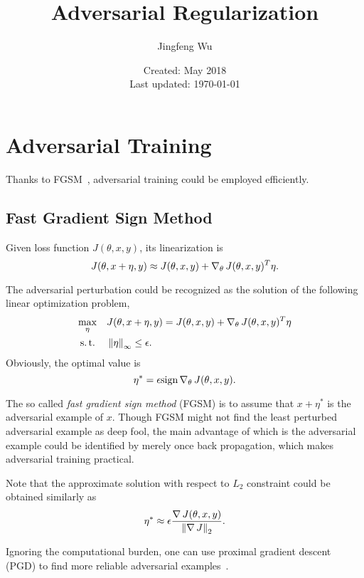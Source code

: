 \documentclass{article}
\title{Adversarial Regularization}
\author{Jingfeng Wu}
\date{Created: May 2018\\ Last updated: \today}
\begin{document}
\maketitle

\section{Adversarial Training}
Thanks to FGSM~\cite{goodfellow2014explaining}, adversarial training could be employed efficiently.

\subsection{Fast Gradient Sign Method}
Given loss function $J(\theta, x, y)$, its linearization is
\begin{equation*}
    J(\theta, x+\eta, y) \approx J(\theta, x, y) + \operatorname{\nabla}_{\theta} J(\theta, x, y)^T \eta.
\end{equation*}

The adversarial perturbation could be recognized as the solution of the following linear optimization problem,
\begin{equation*}
\begin{aligned}
    \max_{\eta} &\quad J(\theta, x+\eta, y) = J(\theta, x, y) + \operatorname{\nabla}_{\theta} J(\theta, x, y)^T \eta \\
    \operatorname{s.t.\,} &\quad \left\|\eta\right\|_{\infty} \le \epsilon.
\end{aligned}
\end{equation*}
Obviously, the optimal value is
\begin{equation*}
    \eta^* = \epsilon \text{sign} \operatorname{\nabla}_{\theta} J(\theta, x, y).
\end{equation*}

The so called \emph{fast gradient sign method} (FGSM) is to assume that $x+\eta^*$ is the adversarial
example of $x$.
Though FGSM might not find the least perturbed adversarial example as deep fool\cite{moosavi2016deepfool},
the main advantage of which is the adversarial example could be identified by merely once back propagation, which makes adversarial training practical.

Note that the approximate solution with respect to $L_2$ constraint could be obtained similarly as
\begin{equation*}
    \eta^* \approx \epsilon \frac{\operatorname{\nabla} J(\theta, x, y)}{\left\|\operatorname{\nabla} J\right\|_2}.
\end{equation*}

Ignoring the computational burden, one can use proximal gradient descent (PGD) to find more reliable adversarial examples~\cite{madry2017towards}.
\end{document}

